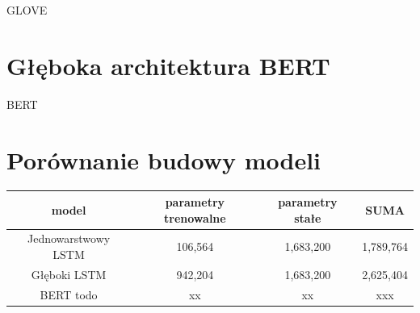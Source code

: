 \cite{brochier2019global} GLOVE

\section{Głęboka architektura BERT}

\cite{devlin2018bert} BERT

\section{Porównanie budowy modeli}

\begin{table}[t]
\label{tab:tabela_modele}
\centering\footnotesize%
\begin{tabular}{c c c c}
\toprule
model & parametry trenowalne & parametry stałe & SUMA \\
\midrule
Jednowarstwowy LSTM   & 106,564 & 1,683,200 & 1,789,764 \\
Głęboki LSTM   & 942,204 & 1,683,200 & 2,625,404 \\
BERT todo   & xx & xx & xxx \\
\bottomrule
\end{tabular}
\end{table}